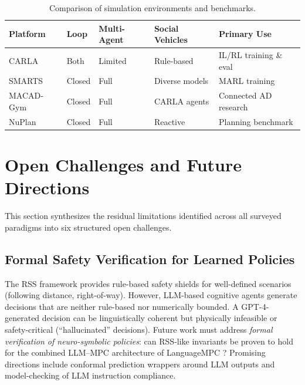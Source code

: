 \documentclass[12pt, a4paper]{article}
\begin{document}
\begin{table}[htbp]
\centering
\caption{Comparison of simulation environments and benchmarks.}
\label{tab:simulators}
\begin{tabular}{lllll}
\toprule
\textbf{Platform} & \textbf{Loop} & \textbf{Multi-Agent} &
\textbf{Social Vehicles} & \textbf{Primary Use} \\
\midrule
CARLA \citep{dosovitskiy2017carlaopenurbandriving} & Both & Limited & Rule-based &
IL/RL training \& eval \\
SMARTS \citep{zhou2020smarts} & Closed & Full & Diverse models &
MARL training \\
MACAD-Gym \citep{palanisamy2020multi} & Closed & Full & CARLA agents &
Connected AD research \\
NuPlan \citep{caesar2021nuplan} & Closed & Full & Reactive &
Planning benchmark \\
\bottomrule
\end{tabular}
\end{table}

\section{Open Challenges and Future Directions}
\label{sec:challenges}

This section synthesizes the residual limitations identified across all surveyed
paradigms into six structured open challenges.

\subsection{Formal Safety Verification for Learned Policies}
\label{sec:safe}

The RSS framework \citep{shalev2016safe} provides rule-based safety shields for
well-defined scenarios (following distance, right-of-way). However, LLM-based
cognitive agents generate decisions that are neither rule-based nor numerically
bounded. A GPT-4-generated decision can be linguistically coherent but physically
infeasible or safety-critical (``hallucinated'' decisions). Future work must
address \emph{formal verification of neuro-symbolic policies}: can RSS-like
invariants be proven to hold for the combined LLM--MPC architecture of
LanguageMPC \citep{sha2023languagempc}? Promising directions include conformal
prediction wrappers around LLM outputs and model-checking of LLM instruction
compliance.
\end{document}

